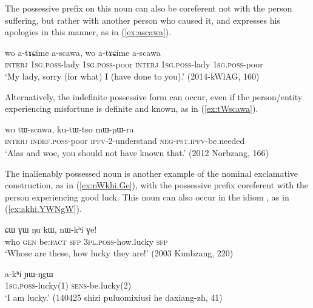 The possessive prefix on this noun can also be coreferent not with the person suffering, but rather with another person who caused it, and expresses his apologies in this manner, as in (\ref{ex:ascawa}).

\begin{exe}
\ex \label{ex:ascawa}
\gll wo a-tɤɕime a-scawa, wo a-tɤɕime a-scawa \\
\textsc{interj} \textsc{1sg}.\textsc{poss}-lady \textsc{1sg}.\textsc{poss}-poor \textsc{interj} \textsc{1sg}.\textsc{poss}-lady \textsc{1sg}.\textsc{poss}-poor  \\ 
\glt `My lady, sorry (for what) I (have done to you).' (2014-kWlAG, 160)
\end{exe}

Alternatively, the indefinite possessive form  can occur, even if the person/entity experiencing misfortune is definite and known, as in (\ref{ex:tWscawa}).

\begin{exe}
\ex \label{ex:tWscawa}
\gll wo tɯ-scawa, ku-tɯ-tso mɯ-pɯ-ra \\
\textsc{interj} \textsc{indef}.\textsc{poss}-poor \textsc{ipfv}-2-understand \textsc{neg}-\textsc{pst}.\textsc{ipfv}-be.needed \\
\glt `Alas and woe, you should not have known that.' (2012 Norbzang, 166)
\end{exe}

The inalienably possessed noun  is another example of the nominal exclamative construction, as in (\ref{ex:nWkhi.Ge}), with the possessive prefix coreferent with the person experiencing good luck. This noun can also occur in the idiom , as in (\ref{ex:akhi.YWNgW}).

\begin{exe}
\ex \label{ex:nWkhi.Ge}
\gll ɕɯ ɣɯ ŋu kɯ, nɯ-kʰi ɣe! \\
who \textsc{gen} be:\textsc{fact} \textsc{sfp} \textsc{3pl}.\textsc{poss}-how.lucky \textsc{sfp} \\
\glt `Whose are these, how lucky they are!' (2003 Kunbzang, 220)
\end{exe}

\begin{exe}
\ex \label{ex:akhi.YWNgW}
\gll a-kʰi ɲɯ-ŋgɯ \\
\textsc{1sg}.\textsc{poss}-lucky(1) \textsc{sens}-be.lucky(2) \\
\glt `I am lucky.' (140425 shizi puluomixiusi he daxiang-zh, 41)
\end{exe}

